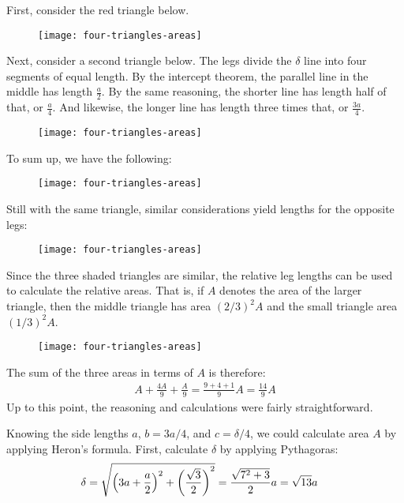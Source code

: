 First, consider the red triangle below. 
\begin{figure}[H]
\centering
\texttt{[image: four-triangles-areas]}
\end{figure}

Next, consider a second triangle below. The legs divide the $\delta$ line into four segments of equal length. By the intercept theorem, the parallel line in the middle has length $\frac{a}{2}$. By the same reasoning, the shorter line has length half of that, or $\frac{a}{4}$. And likewise, the longer line has length three times that, or $\frac{3a}{4}$.
\begin{figure}[H]
\centering
\texttt{[image: four-triangles-areas]}
\end{figure}

To sum up, we have the following:
\begin{figure}[H]
\centering
\texttt{[image: four-triangles-areas]}
\end{figure}

Still with the same triangle, similar considerations yield lengths for the opposite legs:
\begin{figure}[H]
\centering
\texttt{[image: four-triangles-areas]}
\end{figure}

Since the three shaded triangles are similar, the relative leg lengths can be used to calculate the relative areas. That is, if $A$ denotes the area of the larger triangle, then the middle triangle has area $(2/3)^2A$ and the small triangle area $(1/3)^2A$.
\begin{figure}[H]
\centering
\texttt{[image: four-triangles-areas]}
\end{figure}
The sum of the three areas in terms of $A$ is therefore:
\begin{align*}
A + \frac{4A}{9} + \frac{A}{9}
 = \frac{9+4+1}{9} A
 = \frac{14}{9} A
\end{align*}
Up to this point, the reasoning and calculations were fairly straightforward.

Knowing the side lengths $a$, $b=3a/4$, and $c=\delta/4$, we could calculate area $A$ by applying Heron's formula. First, calculate $\delta$  by applying Pythagoras:
\begin{align*}
\delta 
  & = \sqrt{%
    \left(3a + \frac{a}{2}\right)^2 
  + \left(\frac{\sqrt{3}}{2}\right)^2 
  } 
  = \frac{\sqrt{7^2+3}}{2} a
  = \sqrt{13} a
\end{align*}

